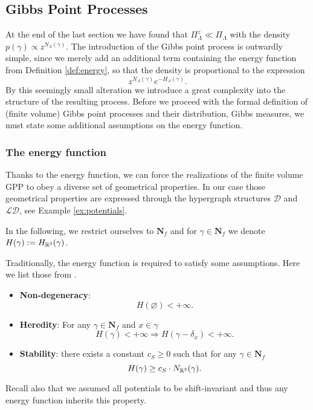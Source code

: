 \subsection{Gibbs Point Processes}\label{sec:GPP}
At the end of the last section we have found that $\Pi^z_\Lambda \ll \Pi_\Lambda$ with the density $p(\gamma) \propto z^{N_\Lambda(\gamma)}$. The introduction of the Gibbs point process is outwardly simple, since we merely add an additional term containing the energy function from Definition \ref{def:energy}, so that the density is proportional to the expression
\begin{equation}\label{eq:GPPdensity}z^{N_\Lambda(\gamma)} e^{-H_\Lambda (\gamma)}.\end{equation}
By this seemingly small alteration we introduce a great complexity into the structure of the resulting process. Before we proceed with the formal definition of (finite volume) Gibbs point processes and their distribution, Gibbs measures, we must state some additional assumptions on the energy function.


\subsubsection{The energy function}\label{sec:energyfunction}

Thanks to the energy function, we can force the realizations of the finite volume GPP to obey a diverse set of geometrical properties. In our case those geometrical properties are expressed through the hypergraph structures $\mathcal D$ and $\mathcal {LD}$, see Example \ref{ex:potentials}. \newline

In the following, we restrict ourselves to $\mathbf N_f$ and for $\gamma \in \mathbf N_f$ we denote $H(\gamma):= H_{\mathbb R^3}(\gamma)$.\newline 

\noindent Traditionally, the energy function is required to satisfy some assumptions. Here we list those from \cite{Dereudre2017}. 
\begin{itemize}
	\item \textbf{Non-degeneracy}:
		$$H(\varnothing) < +\infty.$$
	\item \textbf{Heredity}: For any $\gamma \in \mathbf N_f$ and $x\in \gamma$
		$$H(\gamma)< + \infty \Rightarrow H(\gamma - \delta_x) < +\infty.$$
	\item \textbf{Stability}: there exists a constant $c_S\geq 0$ such that for any $\gamma \in \mathbf N_f$
		$$H(\gamma) \geq c_S\cdot N_{\mathbb R^3} (\gamma).$$
\end{itemize}
Recall also that we assumed all potentials to be shift-invariant and thus any energy function inherits this property.\newline

